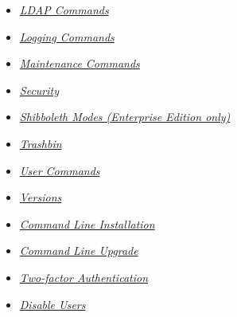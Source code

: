 \documentclass[letterpaper,10pt,english]{sphinxmanual}
\begin{document}
\begin{itemize}
\item {} 
{\hyperref[configuration_server/occ_command:ldap\string-commands\string-label]{\emph{LDAP Commands}}}

\item {} 
{\hyperref[configuration_server/occ_command:logging\string-commands\string-label]{\emph{Logging Commands}}}

\item {} 
{\hyperref[configuration_server/occ_command:maintenance\string-commands\string-label]{\emph{Maintenance Commands}}}

\item {} 
{\hyperref[configuration_server/occ_command:security\string-commands\string-label]{\emph{Security}}}

\item {} 
{\hyperref[configuration_server/occ_command:shibboleth\string-label]{\emph{Shibboleth Modes (Enterprise Edition only)}}}

\item {} 
{\hyperref[configuration_server/occ_command:trashbin\string-label]{\emph{Trashbin}}}

\item {} 
{\hyperref[configuration_server/occ_command:user\string-commands\string-label]{\emph{User Commands}}}

\item {} 
{\hyperref[configuration_server/occ_command:versions\string-label]{\emph{Versions}}}

\item {} 
{\hyperref[configuration_server/occ_command:command\string-line\string-installation\string-label]{\emph{Command Line Installation}}}

\item {} 
{\hyperref[configuration_server/occ_command:command\string-line\string-upgrade\string-label]{\emph{Command Line Upgrade}}}

\item {} 
{\hyperref[configuration_server/occ_command:two\string-factor\string-auth\string-label]{\emph{Two-factor Authentication}}}

\item {} 
{\hyperref[configuration_server/occ_command:disable\string-user\string-label]{\emph{Disable Users}}}

\end{itemize}
\end{document}
